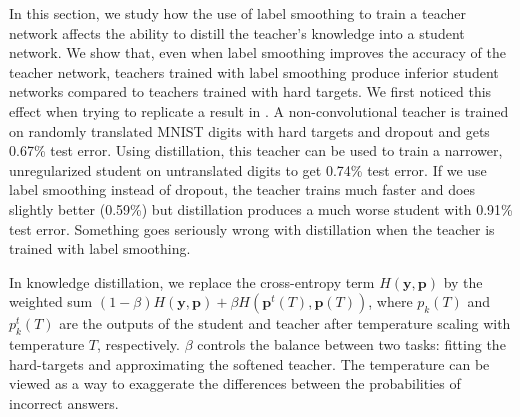 \documentclass{article}
\begin{document}
In this section, we study how the use of label smoothing to train a teacher network affects the ability to distill the teacher's knowledge into a student network. We show that, even when label smoothing improves the accuracy of the teacher network, teachers trained with label smoothing produce inferior student networks compared to teachers trained with hard targets. We first noticed this effect when trying to replicate a result in \citep{hinton2015distilling}.
A non-convolutional teacher is trained on randomly translated MNIST digits with hard targets and dropout and gets 0.67\% test error. Using distillation, this teacher can be used to train a narrower, unregularized student on untranslated digits to get 0.74\% test error. If we use label smoothing instead of dropout, the teacher trains much faster and does slightly better (0.59\%) but distillation produces a much worse student with 0.91\% test error. Something goes seriously wrong with distillation when the teacher is trained with label smoothing. 

In knowledge distillation, we replace the cross-entropy term $H(\bm{y},\bm{p})$ by the weighted sum $(1-\beta)H(\bm{y},\bm{p}) + {\beta}H(\bm{p}^t(T),\bm{p}(T))$, where $p_k(T)$ and $p_k^t(T)$ are the outputs of the student and teacher after temperature scaling with temperature $T$, respectively. $\beta$ controls the balance between two tasks: fitting the hard-targets and approximating the softened teacher. The temperature can be viewed as a way to exaggerate the differences between the probabilities of incorrect answers. 
\end{document}
